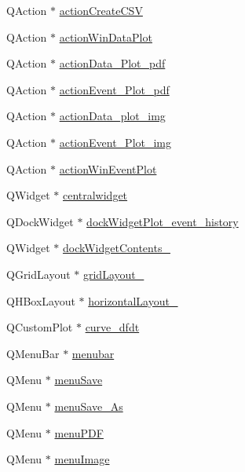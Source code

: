\begin{DoxyCompactItemize}
\item 
Q\+Action $\ast$ \hyperlink{a00028_ae81b7303db9e9c5d730c59b86ec0e960}{action\+Create\+C\+S\+V}
\item 
Q\+Action $\ast$ \hyperlink{a00028_aa09067a9c96c9cd78f75261a9fcb89f0}{action\+Win\+Data\+Plot}
\item 
Q\+Action $\ast$ \hyperlink{a00028_a19203ba5fef3bc68f3d88f1dd3c94777}{action\+Data\+\_\+\+Plot\+\_\+pdf}
\item 
Q\+Action $\ast$ \hyperlink{a00028_a4369770edbf9cb6131a066ca10b3f863}{action\+Event\+\_\+\+Plot\+\_\+pdf}
\item 
Q\+Action $\ast$ \hyperlink{a00028_ae841c150cf6131bef2e8d12da0401ce2}{action\+Data\+\_\+plot\+\_\+img}
\item 
Q\+Action $\ast$ \hyperlink{a00028_a789f5466c7f1781c13d4d027e982ca55}{action\+Event\+\_\+\+Plot\+\_\+img}
\item 
Q\+Action $\ast$ \hyperlink{a00028_ac72ec9c8679d46fd43a87f99ee6db893}{action\+Win\+Event\+Plot}
\item 
Q\+Widget $\ast$ \hyperlink{a00028_ac9ab4609922159e8e4cc45905f76928e}{centralwidget}
\item 
Q\+Dock\+Widget $\ast$ \hyperlink{a00028_a2a8f7ee8d4458dd20481c8a1c29ce185}{dock\+Widget\+Plot\+\_\+event\+\_\+history}
\item 
Q\+Widget $\ast$ \hyperlink{a00028_a538c2b98d6f228a073dea0a3ddb4350e}{dock\+Widget\+Contents\+\_}
\item 
Q\+Grid\+Layout $\ast$ \hyperlink{a00028_a21cc18536b3c91200eceb2e5e01d3293}{grid\+Layout\+\_}
\item 
Q\+H\+Box\+Layout $\ast$ \hyperlink{a00028_a0a28f44d5179dd3cd2c84f4a1ac581c8}{horizontal\+Layout\+\_}
\item 
Q\+Custom\+Plot $\ast$ \hyperlink{a00028_a43d24fa14d90cc27b310542e39dcdd1b}{curve\+\_\+dfdt}
\item 
Q\+Menu\+Bar $\ast$ \hyperlink{a00028_adddc4285028693f10dfd49cd08276e83}{menubar}
\item 
Q\+Menu $\ast$ \hyperlink{a00028_a5ef77bf8c78c201d83049ee8b40cf345}{menu\+Save}
\item 
Q\+Menu $\ast$ \hyperlink{a00028_aaf69c873ec3bf0ea397829122ca4a224}{menu\+Save\+\_\+\+As}
\item 
Q\+Menu $\ast$ \hyperlink{a00028_a4cdb6b113583d4ef43a08b5526c13e3a}{menu\+P\+D\+F}
\item 
Q\+Menu $\ast$ \hyperlink{a00028_af1ff1ecbe6ea007cfeda320cca9865b7}{menu\+Image}

\end{DoxyCompactItemize}
